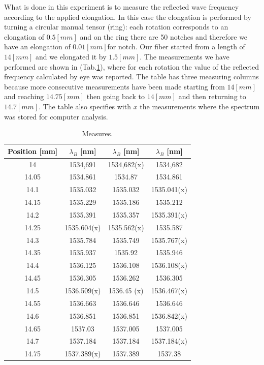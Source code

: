 What is done in this experiment is to measure the reflected wave frequency according to the applied elongation. In this case the elongation is performed by turning a circular manual tensor (ring): each rotation corresponds to an elongation of $0.5 [mm]$ and on the ring there are 50 notches and therefore we have an elongation of $0.01 [mm] $for notch. Our fiber started from a length of $14 [mm]$ and we elongated it by $1.5 [mm]$. The measurements we have performed are shown in (Tab.\ref{table:measures}), where for each rotation the value of the reflected frequency calculated by eye was reported. The table has three measuring columns because more consecutive measurements have been made starting from $14 [mm]$ and reaching $14.75 [mm]$ then going back to $14 [mm]$ and then returning to $14.7 [mm] $. The table also specifies with $x$ the measurements where the spectrum was stored for computer analysis.
\begin{table}[h]
  \centering
  \begin{tabular}{c|c|c|c}
      Position [mm]  &  $\lambda_B$  [nm]  &  $\lambda_B$  [nm]  &  $\lambda_B$  [nm]  \\
      \hline
      14     &  1534,691     &  1534,682(x)  &  1534,682     \\
      14.05  &  1534.861     &  1534.87      &  1534.861     \\
      14.1   &  1535.032     &  1535.032     &  1535.041(x)  \\
      14.15  &  1535.229     &  1535.186     &  1535.212     \\
      14.2   &  1535.391     &  1535.357     &  1535.391(x)  \\
      14.25  &  1535.604(x)  &  1535.562(x)  &  1535.587     \\
      14.3   &  1535.784     &  1535.749     &  1535.767(x)  \\
      14.35  &  1535.937     &  1535.92      &  1535.946     \\
      14.4   &  1536.125     &  1536.108     &  1536.108(x)  \\
      14.45  &  1536.305     &  1536.262     &  1536.305     \\
      14.5   &  1536.509(x)  &  1536.45 (x)  &  1536.467(x)  \\
      14.55  &  1536.663     &  1536.646     &  1536.646     \\
      14.6   &  1536.851     &  1536.851     &  1536.842(x)  \\
      14.65  &  1537.03      &  1537.005     &  1537.005     \\
      14.7   &  1537.184     &  1537.184     &  1537.184(x)  \\
      14.75  &  1537.389(x)  &  1537.389     &  1537.38      \\

  \end{tabular}
  \caption{Measures.}
  \label{table:measures}
\end{table}
